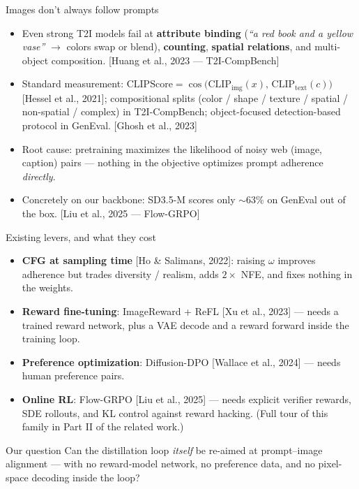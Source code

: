 \documentclass[aspectratio=169,10pt]{beamer}
\newcommand{\cossim}{\operatorname{cos}}
\newcommand{\litref}[1]{{\scriptsize\color{black!55}[#1]}}
\begin{document}
\begin{frame}{Images don't always follow prompts}
  \begin{itemize}
    \item Even strong T2I models fail at \textbf{attribute binding}
      (\emph{``a red book and a yellow vase''} $\to$ colors swap or blend),
      \textbf{counting}, \textbf{spatial relations}, and multi-object
      composition. \litref{Huang et al., 2023 --- T2I-CompBench}
    \item Standard measurement:
      $\mathrm{CLIPScore} = \cossim\!\big(\mathrm{CLIP}_{\mathrm{img}}(x),\,
      \mathrm{CLIP}_{\mathrm{text}}(c)\big)$ \litref{Hessel et al., 2021};
      compositional splits (color / shape / texture / spatial / non-spatial /
      complex) in T2I-CompBench; object-focused detection-based protocol in
      GenEval. \litref{Ghosh et al., 2023}
    \item Root cause: pretraining maximizes the likelihood of noisy web
      (image, caption) pairs --- nothing in the objective optimizes prompt
      adherence \emph{directly}.
    \item Concretely on our backbone: SD3.5-M scores only ${\sim}63\%$ on
      GenEval out of the box. \litref{Liu et al., 2025 --- Flow-GRPO}
  \end{itemize}
\end{frame}

\begin{frame}{Existing levers, and what they cost}
  \begin{itemize}
    \item \textbf{CFG at sampling time} \litref{Ho \& Salimans, 2022}:
      raising $\omega$ improves adherence but trades diversity / realism, adds
      $2\times$ NFE, and fixes nothing in the weights.
    \item \textbf{Reward fine-tuning}: ImageReward + ReFL
      \litref{Xu et al., 2023} --- needs a trained reward network, plus a VAE
      decode and a reward forward inside the training loop.
    \item \textbf{Preference optimization}: Diffusion-DPO
      \litref{Wallace et al., 2024} --- needs human preference pairs.
    \item \textbf{Online RL}: Flow-GRPO \litref{Liu et al., 2025} --- needs
      explicit verifier rewards, SDE rollouts, and KL control against reward
      hacking. (Full tour of this family in Part II of the related work.)
  \end{itemize}
  \vspace{0.6em}
  \begin{alertblock}{Our question}
    Can the distillation loop \emph{itself} be re-aimed at prompt--image
    alignment --- with no reward-model network, no preference data, and no
    pixel-space decoding inside the loop?
  \end{alertblock}
\end{frame}
\end{document}
